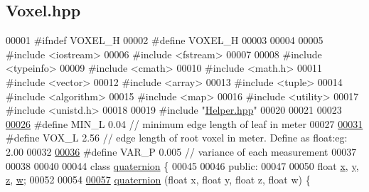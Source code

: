 \hypertarget{Voxel_8hpp_source}{}\subsection{Voxel.\+hpp}
\label{Voxel_8hpp_source}

\begin{DoxyCode}
00001 \textcolor{preprocessor}{#ifndef VOXEL\_H}
00002 \textcolor{preprocessor}{#define VOXEL\_H}
00003 
00004 
00005 \textcolor{preprocessor}{#include <iostream>}
00006 \textcolor{preprocessor}{#include <fstream>}
00007 
00008 \textcolor{preprocessor}{#include <typeinfo>}
00009 \textcolor{preprocessor}{#include <cmath>}
00010 \textcolor{preprocessor}{#include <math.h>}
00011 \textcolor{preprocessor}{#include <vector>}
00012 \textcolor{preprocessor}{#include <array>}
00013 \textcolor{preprocessor}{#include <tuple>}
00014 \textcolor{preprocessor}{#include <algorithm>}
00015 \textcolor{preprocessor}{#include <map>}
00016 \textcolor{preprocessor}{#include <utility>}
00017 \textcolor{preprocessor}{#include <unistd.h>}
00018 
00019 \textcolor{preprocessor}{#include "\hyperlink{Helper_8hpp}{Helper.hpp}"}
00020 
00021 
00023 
\hypertarget{Voxel_8hpp_source.tex_l00026}{}\hyperlink{Voxel_8hpp_a29d8f4bb35f9fa62e1d680bc6ab1f4f1}{00026} \textcolor{preprocessor}{#define MIN\_L 0.04 // minimum edge length of leaf in meter}
00027 
\hypertarget{Voxel_8hpp_source.tex_l00031}{}\hyperlink{Voxel_8hpp_a3c1c8b966e30fa8ca2de07abe3b3d74a}{00031} \textcolor{preprocessor}{#define VOX\_L 2.56 // edge length of root voxel in meter. Define as float:eg: 2.00}
00032 
\hypertarget{Voxel_8hpp_source.tex_l00036}{}\hyperlink{Voxel_8hpp_ae1cd6283839fc3aebf9bccbd1044a365}{00036} \textcolor{preprocessor}{#define VAR\_P 0.005 // variance of each measurement}
00037 
00038 
00040 
00044 \textcolor{keyword}{class }\hyperlink{classquaternion}{quaternion} \{
00045 
00046 \textcolor{keyword}{public}:
00047 
00050     \textcolor{keywordtype}{float} \hyperlink{classquaternion_acdcda48f9dd7ff35873aae38fa33ab78}{x}, \hyperlink{classquaternion_a48e3d1fbf5e12eb54985c32b45dd8303}{y}, \hyperlink{classquaternion_a538598007238d399f79ddcecd39ef5cf}{z}, \hyperlink{classquaternion_ab2b38aca1971114e0ba4218b75d7f472}{w};
00052 
00054 
\hypertarget{Voxel_8hpp_source.tex_l00057}{}\hyperlink{classquaternion_a7939abaec2de1b11ff2208cbd8fbd93e}{00057}     \hyperlink{classquaternion_a7939abaec2de1b11ff2208cbd8fbd93e}{quaternion} (\textcolor{keywordtype}{float} x, \textcolor{keywordtype}{float} y, \textcolor{keywordtype}{float} z, \textcolor{keywordtype}{float} w) \{

\end{DoxyCode}

